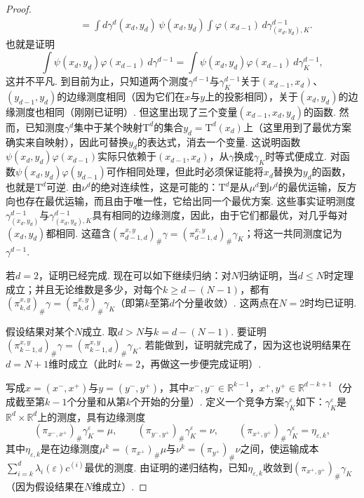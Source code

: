 \begin{proof}
\[\begin{aligned}
&\qquad=\int d\gamma^d(x_d,y_d)\,\psi(x_d,y_d)\int\varphi(x_{d-1})\,d\gamma^{d-1}_{(x_d,y_d),K}.
\end{aligned}
\]
也就是证明
\[
\int\psi(x_d,y_d)\varphi(x_{d-1})\,d\gamma^{d-1}
=\int\psi(x_d,y_d)\varphi(x_{d-1})\,d\gamma_K^{d-1},
\]
这并不平凡. 到目前为止，只知道两个测度$\gamma^{d-1}$与$\gamma_K^{d-1}$关于$(x_{d-1},x_d)$、$(y_{d-1},y_d)$的边缘测度相同（因为它们在$x$与$y$上的投影相同），关于$(x_d,y_d)$的边缘测度也相同（刚刚已证明）. 但这里出现了三个变量$(x_{d-1},x_d,y_d)$的函数. 然而，已知测度$\gamma^d$集中于某个映射$\mathrm T^d$的集合$y_d=\mathrm T^d(x_d)$上（这里用到了最优方案确实来自映射），因此可替换$y_d$的表达式，消去一个变量. 这说明函数$\psi(x_d,y_d)\varphi(x_{d-1})$实际只依赖于$(x_{d-1},x_d)$，从$\gamma$换成$\gamma_K$时等式便成立. 对函数$\psi(x_d,y_d)\varphi(y_{d-1})$可作相同处理，但此时必须保证能将$x_d$替换为$y_d$的函数，也就是$\mathrm T^d$可逆. 由$\nu^d$的绝对连续性，这是可能的：$\mathrm T^d$是从$\mu^d$到$\nu^d$的最优运输，反方向也存在最优运输，而且由于唯一性，它给出同一个最优方案. 这些事实证明测度$\gamma^{d-1}_{(x_d,y_d)}$与$\gamma^{d-1}_{(x_d,y_d),K}$具有相同的边缘测度，因此，由于它们都最优，对几乎每对$(x_d,y_d)$都相同. 这蕴含$(\pi_{d-1,d}^{x,y})_\#\gamma=(\pi_{d-1,d}^{x,y})_\#\gamma_K$；将这一共同测度记为$\gamma^{d-1}$.

若$d=2$，证明已经完成. 现在可以如下继续归纳：对$N$归纳证明，当$d\le N$时定理成立；并且无论维数是多少，对每个$k\ge d-(N-1)$，都有$(\pi_{k,d}^{x,y})_\#\gamma=(\pi_{k,d}^{x,y})_\#\gamma_K$（即第$k$至第$d$个分量收敛）. 这两点在$N=2$时均已证明.

假设结果对某个$N$成立. 取$d>N$与$k=d-(N-1)$. 要证明$(\pi_{k-1,d}^{x,y})_\#\gamma=(\pi_{k-1,d}^{x,y})_\#\gamma_K$. 若能做到，证明就完成了，因为这也说明结果在$d=N+1$维时成立（此时$k=2$，再做这一步便完成证明）.

写成$x=(x^-,x^+)$与$y=(y^-,y^+)$，其中$x^-,y^-\in\mathbb R^{k-1}$，$x^+,y^+\in\mathbb R^{d-k+1}$（分成截至第$k-1$个分量和从第$k$个开始的分量）. 定义一个竞争方案$\gamma_K^\varepsilon$如下：$\gamma_K^\varepsilon$是$\mathbb R^d\times\mathbb R^d$上的测度，具有边缘测度
\[
(\pi_{x^-,x^+})_\#\gamma_K^\varepsilon=\mu,\qquad
(\pi_{y^-,y^+})_\#\gamma_K^\varepsilon=\nu,\qquad
(\pi_{x^+,y^+})_\#\gamma_K^\varepsilon=\eta_{\varepsilon,k},
\]
其中$\eta_{\varepsilon,k}$是在边缘测度$\mu^k=(\pi_{x^+})_\#\mu$与$\nu^k=(\pi_{y^+})_\#\nu$之间，使运输成本$\sum_{i=k}^d\lambda_i(\varepsilon)c^{(i)}$最优的测度. 由证明的递归结构，已知$\eta_{\varepsilon,k}$收敛到$(\pi_{x^+,y^+})_\#\gamma_K$（因为假设结果在$N$维成立）.


\end{proof}
